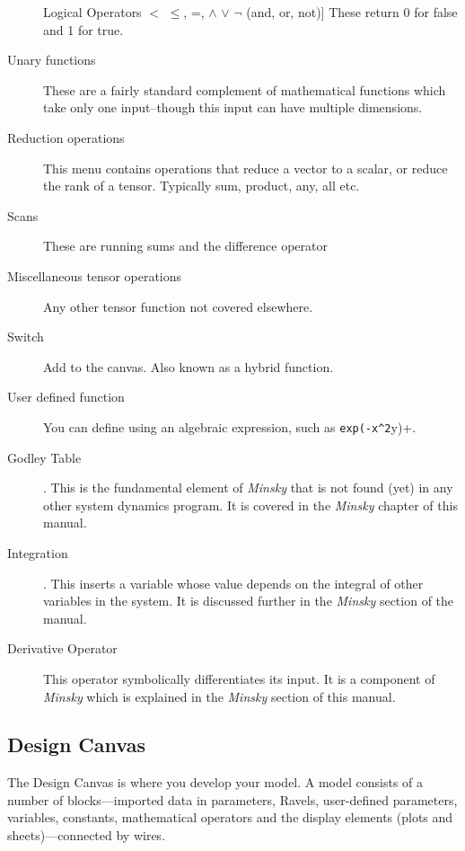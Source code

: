\begin{description}
Logical Operators $<$ $\le$, =, $\wedge$ $\vee$ $\neg$ (and,
or, not){]} These return 0 for false and 1 for true.
\item [{Unary functions}]  These are a fairly standard
complement of mathematical functions which take only one input--though
this input can have multiple dimensions.
\item [{Reduction operations}]  This menu contains
operations that reduce a vector to a scalar, or reduce the rank of
a tensor. Typically sum, product, any, all etc.
\item [{Scans}]  These are running sums and
the difference operator
\item [{Miscellaneous tensor operations}] 
Any other tensor function not covered elsewhere.
\item [{Switch}]  Add  to the canvas. Also known as a hybrid
function.
\item [{User defined function}]  You can
define  using
an algebraic expression, such as \verb+exp(-x^2+y)+.
\item [{Godley Table}] . \label{GodleyTable}
This is the fundamental element of \emph{Minsky} that is not found
(yet) in any other system dynamics program. It is covered in the \emph{Minsky}
chapter of this manual.
\item [{Integration}] .\label{Integrate} This inserts
a variable whose value depends on the integral of other variables
in the system. It is discussed further in the \emph{Minsky} section
of the manual.
\item [{Derivative Operator}]  This operator
symbolically differentiates its input. It is a component of \emph{Minsky}
which is explained in the \emph{Minsky} section of this manual.
\end{description}

\subsection{Design Canvas}

\label{DesignCanvas}\label{tabs:Wiring}

The Design Canvas is where you develop your model. A model consists
of a number of blocks---imported data in parameters, Ravels, user-defined
parameters, variables, constants, mathematical operators and the display
elements (plots and sheets)---connected by wires.

